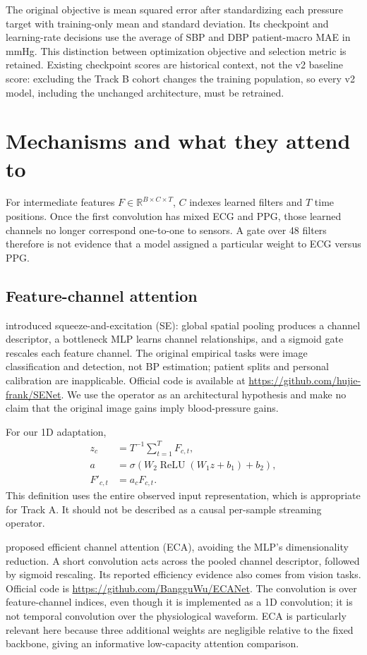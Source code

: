 \documentclass[11pt]{article}
\begin{document}
The original objective is mean squared error after standardizing each pressure target with training-only mean and standard deviation. Its checkpoint and learning-rate decisions use the average of SBP and DBP patient-macro MAE in mmHg. This distinction between optimization objective and selection metric is retained. Existing checkpoint scores are historical context, not the v2 baseline score: excluding the Track B cohort changes the training population, so every v2 model, including the unchanged architecture, must be retrained.

\section{Mechanisms and what they attend to}
For intermediate features $F\in\mathbb{R}^{B\times C\times T}$, $C$ indexes learned filters and $T$ time positions. Once the first convolution has mixed ECG and PPG, those learned channels no longer correspond one-to-one to sensors. A gate over 48 filters therefore is not evidence that a model assigned a particular weight to ECG versus PPG.

\subsection{Feature-channel attention}
\citet{hu2018se} introduced squeeze-and-excitation (SE): global spatial pooling produces a channel descriptor, a bottleneck MLP learns channel relationships, and a sigmoid gate rescales each feature channel. The original empirical tasks were image classification and detection, not BP estimation; patient splits and personal calibration are inapplicable. Official code is available at \url{https://github.com/hujie-frank/SENet}. We use the operator as an architectural hypothesis and make no claim that the original image gains imply blood-pressure gains.

For our 1D adaptation,
\begin{align}
z_c &= T^{-1}\sum_{t=1}^{T}F_{c,t},\\
a &= \sigma\!\left(W_2\operatorname{ReLU}(W_1z+b_1)+b_2\right),\\
F'_{c,t} &= a_cF_{c,t}.
\end{align}
This definition uses the entire observed input representation, which is appropriate for Track A. It should not be described as a causal per-sample streaming operator.

\citet{wang2020eca} proposed efficient channel attention (ECA), avoiding the MLP's dimensionality reduction. A short convolution acts across the pooled channel descriptor, followed by sigmoid rescaling. Its reported efficiency evidence also comes from vision tasks. Official code is \url{https://github.com/BangguWu/ECANet}. The convolution is over feature-channel indices, even though it is implemented as a 1D convolution; it is not temporal convolution over the physiological waveform. ECA is particularly relevant here because three additional weights are negligible relative to the fixed backbone, giving an informative low-capacity attention comparison.
\end{document}
